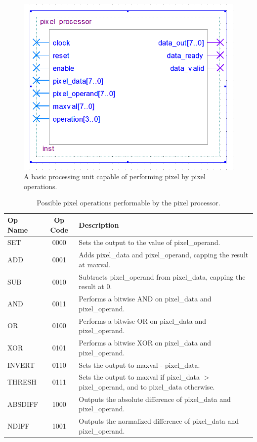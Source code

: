 \documentclass[a4paper, 10pt, titlepage]{article}
\begin{document}
\begin{figure}
    \centering
    \includegraphics[width=0.5\linewidth]{pixel_processor_entity.PNG}
    \caption{A basic processing unit capable of performing pixel by pixel operations.}
    \label{fig:pixel_processor}
\end{figure}

\begin{table}
    \centering
    \begin{tabular}[c]{ l | c | p{10.5cm} }
        \textbf{Op Name} & \textbf{Op Code} & \textbf{Description} \\
        \hline
        SET & 0000 & Sets the output to the value of pixel\_operand. \\
        ADD & 0001 & Adds pixel\_data and pixel\_operand, capping the result at maxval. \\
        SUB & 0010 & Subtracts pixel\_operand from pixel\_data, capping the result at 0. \\
        AND & 0011 & Performs a bitwise AND on pixel\_data and pixel\_operand. \\
        OR & 0100 & Performs a bitwise OR on pixel\_data and pixel\_operand. \\
        XOR & 0101 & Performs a bitwise XOR on pixel\_data and pixel\_operand. \\
        INVERT & 0110 & Sets the output to maxval - pixel\_data. \\
        THRESH & 0111 & Sets the output to maxval if pixel\_data $>$ pixel\_operand, and to pixel\_data otherwise. \\
        ABSDIFF & 1000 & Outputs the absolute difference of pixel\_data and pixel\_operand. \\
        NDIFF & 1001 & Outputs the normalized difference of pixel\_data and pixel\_operand. \\
    \end{tabular}
    \caption{Possible pixel operations performable by the pixel processor.}
    \label{tab:pixel_operations}
\end{table}
\end{document}
